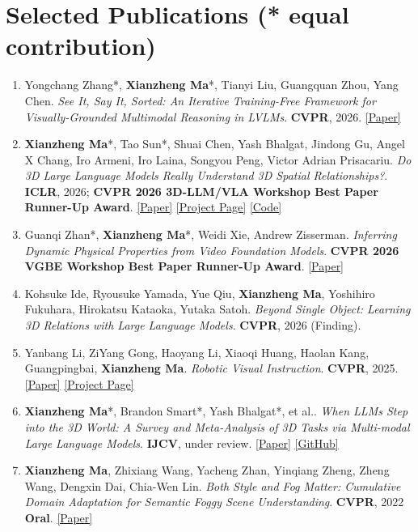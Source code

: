 \documentclass[11pt,a4paper]{article}
\newcommand{\paper}[4]{%
  \item #1. \textit{#2}. #3. #4
}
\begin{document}
\section{Selected Publications \textnormal{\small{(* equal contribution)}}}
\begin{enumerate}[leftmargin=*, labelsep=0.5em, itemsep=4pt]

\paper{Yongchang Zhang*, \textbf{Xianzheng Ma}*, Tianyi Liu, Guangquan Zhou, Yang Chen}
{See It, Say It, Sorted: An Iterative Training-Free Framework for Visually-Grounded Multimodal Reasoning in LVLMs}
{\textbf{CVPR}, 2026}
{\href{https://arxiv.org/abs/2602.21497v1}{[Paper]}}

\paper{\textbf{Xianzheng Ma}*, Tao Sun*, Shuai Chen, Yash Bhalgat, Jindong Gu, Angel X Chang, Iro Armeni, Iro Laina, Songyou Peng, Victor Adrian Prisacariu}
{Do 3D Large Language Models Really Understand 3D Spatial Relationships?}
{\textbf{ICLR}, 2026; \textbf{CVPR 2026 3D-LLM/VLA Workshop Best Paper Runner-Up Award}}
{\href{https://arxiv.org/abs/2603.23523}{[Paper]} \href{https://real-3dqa.github.io/}{[Project Page]} \href{https://github.com/xianzhengma/Real-3DQA}{[Code]}}

\paper{Guanqi Zhan*, \textbf{Xianzheng Ma}*, Weidi Xie, Andrew Zisserman}
{Inferring Dynamic Physical Properties from Video Foundation Models}
{\textbf{CVPR 2026 VGBE Workshop Best Paper Runner-Up Award}}
{\href{https://arxiv.org/abs/2510.02311}{[Paper]}}

\paper{Kohsuke Ide, Ryousuke Yamada, Yue Qiu, \textbf{Xianzheng Ma}, Yoshihiro Fukuhara, Hirokatsu Kataoka, Yutaka Satoh}
{Beyond Single Object: Learning 3D Relations with Large Language Models}
{\textbf{CVPR}, 2026 (Finding)}
{}

\paper{Yanbang Li, ZiYang Gong, Haoyang Li, Xiaoqi Huang, Haolan Kang, Guangpingbai, \textbf{Xianzheng Ma}}
{Robotic Visual Instruction}
{\textbf{CVPR}, 2025}
{\href{https://arxiv.org/abs/2505.00693}{[Paper]} \href{https://robotic-visual-instruction.github.io/}{[Project Page]}}

\paper{\textbf{Xianzheng Ma}*, Brandon Smart*, Yash Bhalgat*, et al.}
{When LLMs Step into the 3D World: A Survey and Meta-Analysis of 3D Tasks via Multi-modal Large Language Models}
{\textbf{IJCV}, under review}
{\href{https://arxiv.org/abs/2405.10255v2}{[Paper]} \href{https://github.com/ActiveVisionLab/Awesome-LLM-3D}{[GitHub]}}

\paper{\textbf{Xianzheng Ma}, Zhixiang Wang, Yacheng Zhan, Yinqiang Zheng, Zheng Wang, Dengxin Dai, Chia-Wen Lin}
{Both Style and Fog Matter: Cumulative Domain Adaptation for Semantic Foggy Scene Understanding}
{\textbf{CVPR}, 2022 \textbf{Oral}}
{\href{https://arxiv.org/abs/2112.00484}{[Paper]}}


\end{enumerate}
\end{document}
